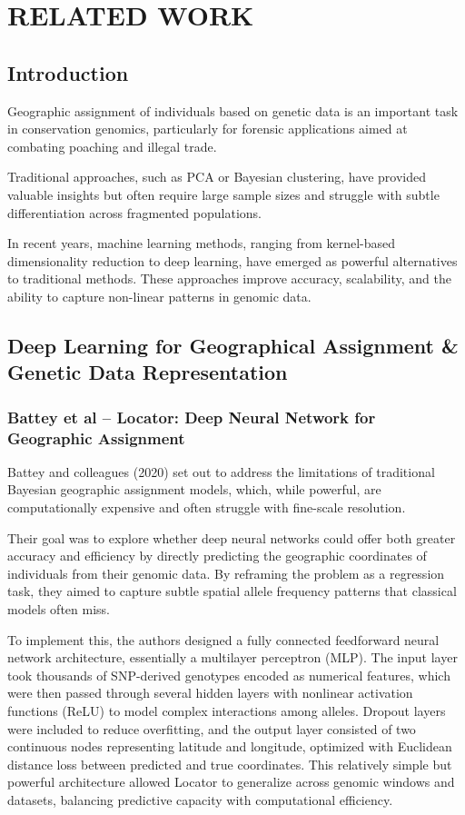 \chapter{RELATED WORK}
\label{chap:related_work}

\section{Introduction}

Geographic assignment of individuals based on genetic data is an important task in conservation genomics, particularly for forensic applications aimed at combating poaching and illegal trade.

Traditional approaches, such as PCA or Bayesian clustering, have provided valuable insights but often require large sample sizes and struggle with subtle differentiation across fragmented populations.

In recent years, machine learning methods, ranging from kernel-based dimensionality reduction to deep learning, have emerged as powerful alternatives to traditional methods. These approaches improve accuracy, scalability, and the ability to capture non-linear patterns in genomic data.

\section{Deep Learning for Geographical Assignment \& Genetic Data Representation}

\subsection{Battey et al – Locator: Deep Neural Network for Geographic Assignment}

Battey and colleagues (2020) \cite{battey2020predicting} set out to address the limitations of traditional Bayesian geographic assignment models, which, while powerful, are computationally expensive and often struggle with fine-scale resolution.

Their goal was to explore whether deep neural networks could offer both greater accuracy and efficiency by directly predicting the geographic coordinates of individuals from their genomic data. By reframing the problem as a regression task, they aimed to capture subtle spatial allele frequency patterns that classical models often miss.

To implement this, the authors designed a fully connected feedforward neural network architecture, essentially a multilayer perceptron (MLP). The input layer took thousands of SNP-derived genotypes encoded as numerical features, which were then passed through several hidden layers with nonlinear activation functions (ReLU) to model complex interactions among alleles. Dropout layers were included to reduce overfitting, and the output layer consisted of two continuous nodes representing latitude and longitude, optimized with Euclidean distance loss between predicted and true coordinates. This relatively simple but powerful architecture allowed Locator to generalize across genomic windows and datasets, balancing predictive capacity with computational efficiency.


